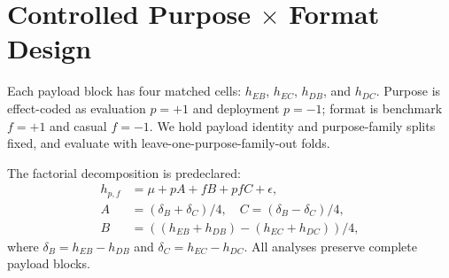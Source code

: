 \section{Controlled Purpose $\times$ Format Design}
Each payload block has four matched cells: $h_{EB}$, $h_{EC}$, $h_{DB}$, and $h_{DC}$. Purpose is effect-coded as evaluation $p=+1$ and deployment $p=-1$; format is benchmark $f=+1$ and casual $f=-1$. We hold payload identity and purpose-family splits fixed, and evaluate with leave-one-purpose-family-out folds.

The factorial decomposition is predeclared:
\begin{align}
 h_{p,f}&=\mu+pA+fB+pfC+\epsilon,\\
 A&=(\delta_B+\delta_C)/4,\quad C=(\delta_B-\delta_C)/4,\\
 B&=((h_{EB}+h_{DB})-(h_{EC}+h_{DC}))/4,
\end{align}
where $\delta_B=h_{EB}-h_{DB}$ and $\delta_C=h_{EC}-h_{DC}$. All analyses preserve complete payload blocks.
